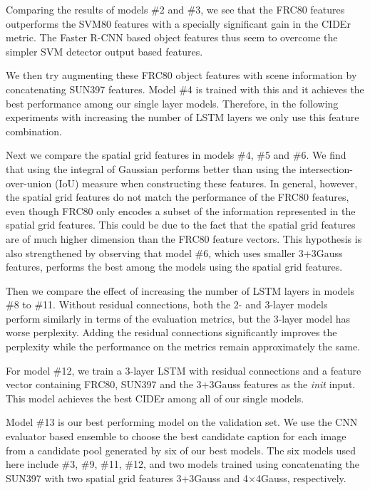 Comparing the results of models \#2 and \#3, we see that the FRC80 features
outperforms the SVM80 features with a specially significant gain in the CIDEr
metric.  
The Faster R-CNN based object features thus seem to overcome the simpler SVM
detector output based features.

We then try augmenting these FRC80 object features with scene information by
concatenating SUN397 features.
Model \#4 is trained with this and it achieves the best performance among our
single layer models.
Therefore, in the following experiments with increasing the number of LSTM
layers we only use this feature combination.

Next we compare the spatial grid features in models \#4, \#5 and \#6. 
We find that using the integral of Gaussian performs better than using the
intersection-over-union (IoU) measure when constructing these features. 
In general, however, the spatial grid features do not match the performance of
the FRC80 features, even though FRC80 only encodes a subset of the information
represented in the spatial grid features.
This could be due to the fact that the spatial grid features are of much higher
dimension than the FRC80 feature vectors.
This hypothesis is also strengthened by observing that model \#6, which uses
smaller 3+3Gauss features, performs the best among the models using the spatial
grid features.

Then we compare the effect of increasing the number of LSTM layers in models \#8
to \#11. 
Without residual connections, both the 2- and 3-layer models perform similarly
in terms of the evaluation metrics, but the 3-layer model has worse perplexity.
Adding the residual connections significantly improves the perplexity while the
performance on the metrics remain approximately the same.

For model \#12, we train a 3-layer LSTM with residual connections and a feature
vector containing FRC80, SUN397 and the 3+3Gauss features as the \emph{init}
input. This model achieves the best CIDEr among all of our single models.

Model \#13 is our best performing model on the validation set. 
We use the CNN evaluator based ensemble to choose the best candidate caption for
each image from a candidate pool generated by six of our best models.
The six models used here include \#3, \#9, \#11, \#12, and two models trained
using concatenating the SUN397 with two spatial grid features 3+3Gauss and
4$\times$4Gauss, respectively.

